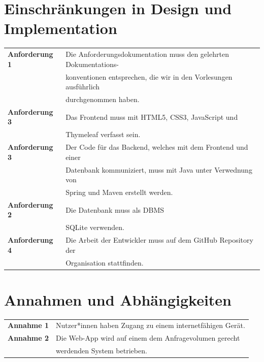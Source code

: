 \documentclass[paper=a4, parskip=half]{scrreprt}
\begin{document}
\section{Einschränkungen in Design und Implementation}
\begin{table}[!htb]
\begin{tabular}{ll}
\textbf{Anforderung 1} & Die Anforderungsdokumentation muss den gelehrten Dokumentations- \\
& konventionen entsprechen, die wir in den Vorlesungen ausführlich \\ 
& durchgenommen haben. \vspace{0.15cm} \\

\textbf{Anforderung 3} & Das Frontend muss mit HTML5, CSS3, JavaScript und \\
& Thymeleaf verfasst sein. \vspace{0.15cm}\\
\textbf{Anforderung 3} & Der Code für das Backend, welches mit dem Frontend und einer \\
& Datenbank kommuniziert, muss mit Java unter Verwednung von \\
& Spring und Maven erstellt werden. \vspace{0.15cm}\\
\textbf{Anforderung 2} & Die Datenbank muss als \ac{DBMS} \\
& SQLite verwenden. \vspace{0.15cm}\\
\textbf{Anforderung 4} & Die Arbeit der Entwickler muss auf dem GitHub Repository der \\
& Organisation stattfinden. \vspace{0.15cm}\\
\end{tabular}
\end{table}

\pagebreak

\section{Annahmen und Abhängigkeiten}
\begin{table}[!htb]
\begin{tabular}{ll}
\textbf{Annahme 1} & Nutzer*innen haben Zugang zu einem internetfähigen Gerät. \vspace{0.15cm} \\
\textbf{Annahme 2} & Die Web-App wird auf einem dem Anfragevolumen gerecht \\
& werdenden System betrieben. \vspace{0.15cm} \\
\end{tabular}
\end{table}
\end{document}
